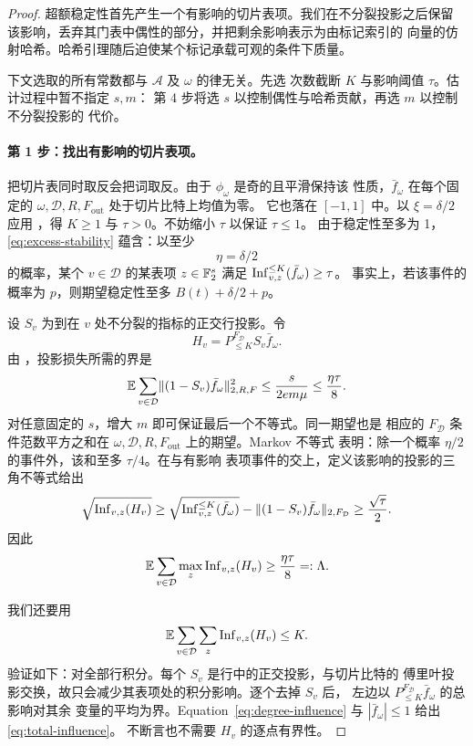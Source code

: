 \begin{proof}
超额稳定性首先产生一个有影响的切片表项。我们在不分裂投影之后保留
该影响，丢弃其门表中偶性的部分，并把剩余影响表示为由标记索引的
向量的仿射哈希。哈希引理随后迫使某个标记承载可观的条件下质量。

下文选取的所有常数都与 $\mathcal A$ 及 $\omega$ 的律无关。先选
次数截断 $K$ 与影响阈值 $\tau$。估计过程中暂不指定 $s,m$：
第 4 步将选 $s$ 以控制偶性与哈希贡献，再选 $m$ 以控制不分裂投影的
代价。

\paragraph{第 1 步：找出有影响的切片表项。}
把切片表同时取反会把词取反。由于 $\phi_\omega$ 是奇的且平滑保持该
性质，$\bar f_\omega$ 在每个固定的
$\omega,\mathcal D,R,F_{\mathrm{out}}$ 处于切片比特上均值为零。
它也落在 $[-1,1]$ 中。以 $\xi=\delta/2$ 应用 ，得
$K\ge1$ 与 $\tau>0$。不妨缩小 $\tau$ 以保证 $\tau\le1$。
由于稳定性至多为 1，\eqref{eq:excess-stability} 蕴含：以至少
\[
 \eta=\delta/2
\]
的概率，某个 $v\in\mathcal D$ 的某表项 $z\in\mathbb F_2^s$ 满足
$\operatorname{Inf}_{v,z}^{\le K}(\bar f_\omega)\ge\tau$。
事实上，若该事件的概率为 $p$，则期望稳定性至多
$B(t)+\delta/2+p$。

设 $S_v$ 为到在 $v$ 处不分裂的指标的正交行投影。令
\[
 H_v=P_{\le K}^{F_{\mathcal D}}S_v\bar f_\omega.
\]
由 ，投影损失所需的界是
\begin{equation}\label{eq:choose-m}
 \mathbb E\sum_{v\in\mathcal D}
 \lVert(1-S_v)\bar f_\omega\rVert_{2,R,F}^2
 \le\frac{s}{2em\mu}\le\frac{\eta\tau}{8}.
\end{equation}
对任意固定的 $s$，增大 $m$ 即可保证最后一个不等式。同一期望也是
相应的 $F_{\mathcal D}$ 条件范数平方之和在
$\omega,\mathcal D,R,F_{\mathrm{out}}$ 上的期望。Markov 不等式
表明：除一个概率 $\eta/2$ 的事件外，该和至多 $\tau/4$。在与有影响
表项事件的交上，定义该影响的投影的三角不等式给出
\[
 \sqrt{\operatorname{Inf}_{v,z}(H_v)}
 \ge\sqrt{\operatorname{Inf}_{v,z}^{\le K}(\bar f_\omega)}
      -\lVert(1-S_v)\bar f_\omega\rVert_{2,F_{\mathcal D}}
 \ge\frac{\sqrt\tau}{2}.
\]
因此
\begin{equation}\label{eq:large-max-sum}
 \mathbb E\sum_{v\in\mathcal D}\max_z\operatorname{Inf}_{v,z}(H_v)
 \ge\frac{\eta\tau}{8}=:\Lambda.
\end{equation}

我们还要用
\begin{equation}\label{eq:total-influence}
 \mathbb E\sum_{v\in\mathcal D}\sum_z\operatorname{Inf}_{v,z}(H_v)\le K.
\end{equation}
验证如下：对全部行积分。每个 $S_v$ 是行中的正交投影，与切片比特的
傅里叶投影交换，故只会减少其表项处的积分影响。逐个去掉 $S_v$ 后，
左边以 $P_{\le K}^{F_{\mathcal D}}\bar f_\omega$ 的总影响对其余
变量的平均为界。Equation~\eqref{eq:degree-influence} 与
$|\bar f_\omega|\le1$ 给出 \eqref{eq:total-influence}。
不断言也不需要 $H_v$ 的逐点有界性。


\end{proof}
